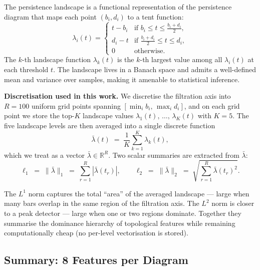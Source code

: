 \documentclass[12pt, a4paper]{article}
\theoremstyle{definition}
\theoremstyle{plain}
\newcommand{\R}{\mathbb{R}}
\begin{document}
The persistence landscape \citep{bubenik2015statistical} is a functional
representation of the persistence diagram that maps each point $(b_i, d_i)$
to a tent function:
\[
  \lambda_i(t) = \begin{cases}
    t - b_i & \text{if } b_i \leq t \leq \tfrac{b_i+d_i}{2}, \\
    d_i - t & \text{if } \tfrac{b_i+d_i}{2} \leq t \leq d_i, \\
    0 & \text{otherwise.}
  \end{cases}
\]
The $k$-th landscape function $\lambda_k(t)$ is the $k$-th largest value among
all $\lambda_i(t)$ at each threshold $t$. The landscape lives in a Banach space
and admits a well-defined mean and variance over samples, making it amenable to
statistical inference.

\medskip\noindent
\textbf{Discretisation used in this work.} We discretise the filtration axis
into $R = 100$ uniform grid points spanning $[\min_i b_i,\, \max_i d_i]$, and
on each grid point we store the top-$K$ landscape values
$\lambda_1(t),\,\ldots,\,\lambda_K(t)$ with $K = 5$. The five landscape levels
are then averaged into a single discrete function
\begin{equation}
  \bar\lambda(t) \;=\; \frac{1}{K} \sum_{k=1}^{K} \lambda_k(t),
\end{equation}
which we treat as a vector $\bar\lambda \in \R^R$. Two scalar summaries are
extracted from $\bar\lambda$:
\begin{equation}
  \ell_1 \;=\; \|\bar\lambda\|_1 \;=\; \sum_{r=1}^{R} |\bar\lambda(t_r)|,
  \qquad
  \ell_2 \;=\; \|\bar\lambda\|_2 \;=\; \sqrt{\sum_{r=1}^{R} \bar\lambda(t_r)^2}.
  \label{eq:landscapes}
\end{equation}

The $L^1$ norm captures the total ``area'' of the averaged landscape — large
when many bars overlap in the same region of the filtration axis. The $L^2$
norm is closer to a peak detector — large when one or two regions dominate.
Together they summarise the dominance hierarchy of topological features while
remaining computationally cheap (no per-level vectorisation is stored).

\subsection{Summary: 8 Features per Diagram}
\end{document}
